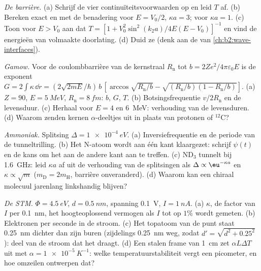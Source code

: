 \begin{exercise}[$\star\star$]\label{exo:b2:potential-wells-tunneling:8}
\emph{De barrière.} (a) Schrijf de vier continuïteitsvoorwaarden op en
leid $T$ af. (b) Bereken exact en met de benadering voor $E =
V_0/2$,
$\kappa a = 3$; voor $\kappa a = 1$. (c) Toon voor $E > V_0$ aan dat
$T = [1 +
V_0^2\sin^2(k_2a)/4E(E - V_0)]^{-1}$ en vind de energieën van
volmaakte
doorlating. (d) Duid ze (denk aan de  van
\cref{ch:b2:wave-interfaces}).
\end{exercise}

\begin{exercise}[$\star\star$]\label{exo:b2:potential-wells-tunneling:9}
\emph{Gamow.} Voor de coulombbarrière van de kernstraal $R_{\text{n}}$
tot $b = 2Ze^2/4\pi\varepsilon_0E$ is de exponent
$G = 2\int\kappa\,\dd r =
(2\sqrt{2mE}/\hbar)\,b\,[\arccos\sqrt{R_{\text{n}}/b} - \sqrt{(R_{\text{n}}/b)(1 -
R_{\text{n}}/b)}]$.
(a) $Z = 90$, $E = \qty{5}{MeV}$, $R_{\text{n}} = \qty{8}{fm}$:
$b$, $G$, $T$. (b) Botsingsfrequentie $v/2R_{\text{n}}$ en de levensduur. (c)
Herhaal voor $E = 4$ en \qty{6}{MeV}: verhouding van de levensduren. (d)
Waarom zenden
kernen $\alpha$-deeltjes uit in plaats van protonen of $^{12}$C?
\end{exercise}

\begin{exercise}[$\star\star\star$]\label{exo:b2:potential-wells-tunneling:10}
\emph{Ammoniak.} Splitsing $\Delta = \qty{1e-4}{eV}$. (a) Inversiefrequentie
en de periode van de tunneltrilling. (b) Het N-atoom wordt aan
één kant klaargezet: schrijf $\psi(t)$ en de kans om het aan
de andere kant aan te treffen. (c) ND$_3$ tunnelt bij \qty{1.6}{GHz}: leid
$\kappa a$
af uit de verhouding van de splitsingen als $\Delta \propto \eu^{-\kappa a}$
en $\kappa
\propto\sqrt m$ ($m_{\text{D}} = 2m_{\text{H}}$, barrière
onveranderd). (d) Waarom kan
een chiraal molecuul jarenlang linkshandig blijven?
\end{exercise}

\begin{exercise}[$\star\star\star$]\label{exo:b2:potential-wells-tunneling:11}
\emph{De STM.} $\Phi = \qty{4.5}{eV}$, $d = \qty{0.5}{nm}$, spanning \qty{0.1}{V},
$I = \qty{1}{nA}$. (a) $\kappa$, de factor van $I$ per \qty{0.1}{nm}, het
hoogteoplossend vermogen als $I$ tot op $1\%$ wordt gemeten. (b) Elektronen
per seconde
in de stroom. (c) Het topatoom van de punt staat \qty{0.25}{nm} dichter dan zijn
buren (zijdelings \qty{0.25}{nm} weg, zodat $d' = \sqrt{d^2 + 0.25^2}$):
deel van de stroom dat het draagt. (d) Een stalen frame van \qty{1}{cm} zet
$\alpha L\Delta T$ uit met $\alpha = \qty{1e-5}{K^{-1}}$: welke
temperatuur\-stabiliteit
vergt een picometer, en hoe omzeilen ontwerpen dat?
\end{exercise}

